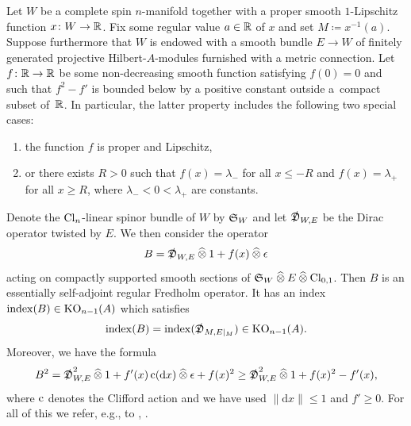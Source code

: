 \documentclass[11pt]{article}
\numberwithin{equation}{section}
\begin{document}
Let \(W\) be a complete spin \(n\)-manifold together with a proper smooth \(1\)-Lipschitz function \(x \colon W \to \mathbb{R}\).
Fix some regular value \(a \in \mathbb{R}\) of \(x\) and set \(M \coloneqq x^{-1}(a)\).
Suppose furthermore that \(W\) is endowed with a smooth bundle \(E \to W\) of finitely generated projective Hilbert-\(A\)-modules furnished with a metric connection.
Let \(f \colon \mathbb{R} \to \mathbb{R}\) be some non-decreasing smooth function satisfying \(f(0) = 0\) and such that \(f^2 - f'\) is bounded below by a positive constant outside a~compact subset of~\(\mathbb{R}\).
In particular, the latter property includes the following two special cases:
\begin{enumerate}\itemsep=0pt
 \item[(i)] the function \(f\) is proper and Lipschitz,
 \item[(ii)] or there exists \(R > 0\) such that \(f(x) = \lambda_-\) for all \(x \leq -R\) and \(f(x) = \lambda_+\) for all \(x \geq R\), where \(\lambda_- < 0 < \lambda_+\) are constants.
\end{enumerate}
Denote the \(\mathrm{Cl}_n\)-linear spinor bundle of \(W\) by \(\mathfrak{S}_W\) and let \(\slashed{\mathfrak{D}}_{W,E}\) be the Dirac operator twisted by \(E\).
We then consider the operator
\[
 B = \slashed{\mathfrak{D}}_{W, E} \mathbin{\widehat{\otimes}} 1 + f(x) \mathbin{\widehat{\otimes}} \epsilon
\]
acting on compactly supported smooth sections of \(\mathfrak{S}_W \mathbin{\widehat{\otimes}} E \mathbin{\widehat{\otimes}} \mathrm{Cl}_{0,1}\).
Then \(B\) is an essentially self-adjoint regular Fredholm operator.
It has an index \(\operatorname{index}(B) \in \operatorname{KO}_{n-1}(A)\) which satisfies
\[
 \operatorname{index}(B) = \operatorname{index}(\slashed{\mathfrak{D}}_{M, E|_M}) \in \operatorname{KO}_{n-1}(A).
\]
Moreover, we have the formula
\begin{equation}
B^2 = \Dirac^2_{W,E} \tensgr 1 + f'(x) \clm(\D x) \tensgr \epsilon + f(x)^2 \geq \Dirac^2_{W,E} \tensgr 1 + f(x)^2 - f'(x),
\label{eq:callias-estimate}
\end{equation}
where \(\operatorname{c}\) denotes the Clifford action and we have used \(\|\mathrm{d} x\| \leq 1\) and \(f' \geq 0\).
For all of this we refer, e.g., to \cite[Section~6]{Cecchini:LongNeck}, \cite[Appendix~A]{Zeidler:band-width-estimates}.
\end{document}
